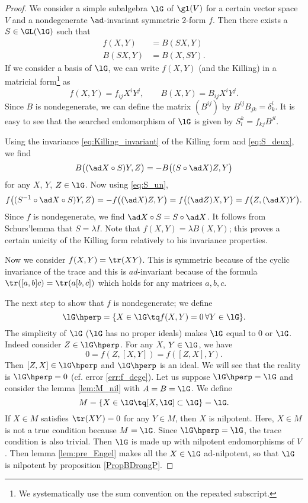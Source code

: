 \begin{proof}
    We consider a simple subalgebra $\lG$ of $\gl(V)$ for a certain vector space $V$ and a nondegenerate $\ad$-invariant symmetric $2$-form $f$. Then there exists a $S\in\GL(\lG)$ such that
    \begin{subequations}
    \begin{align}
      f(X,Y)&=B(SX,Y) \label{eq:S_un}  \\ 
      B(SX,Y)&=B(X,SY).  \label{eq:S_deux}
    \end{align}
    \end{subequations}
    If we consider a basis of $\lG$, we can write $f(X,Y)$ (and the Killing) in a matricial form\footnote{We systematically use the sum convention on the repeated subscript.} as
    \[
      f(X,Y)=f_{ij}X^iY^j,\qquad B(X,Y)=B_{ij}X^iY^j.
    \]
    Since $B$ is nondegenerate, we can define the matrix $(B^{ij})$ by $B^{ij}B_{jk}=\delta^i_k$. It is easy to see that the searched endomorphism of $\lG$ is given by $S^k_l=f_{kj}B^{jl}$.
     
    Using the invariance \eqref{eq:Killing_invariant} of the Killing form and \eqref{eq:S_deux}, we find
    \[
       B\big( (\ad X\circ S)Y,Z  \big)=-B\big( (S\circ\ad X)Z,Y  \big)
    \]
    for any $X$, $Y$, $Z\in\lG$. Now using \eqref{eq:S_un}, 
    \begin{equation}
     f\big(  (S^{-1}\circ\ad X\circ S)Y,Z  \big)=-f\big((\ad X) Z,Y\big)
                                               =f\big( (\ad Z) X,Y \big)
                           =f\big( Z, (\ad X)Y \big).
    \end{equation}
    Since $f$ is nondegenerate, we find $\ad X\circ S=S\circ\ad X$. It follows from Schurs'lemma that $S=\lambda I$. Note that $f(X,Y)=\lambda B(X,Y)$; this proves a certain unicity of the Killing form relatively to his invariance properties.

    Now we consider $f(X,Y)=\tr(XY)$. This is symmetric because of the cyclic invariance of the trace and this is $ad$-invariant because of the formula $\tr([a,b]c)=\tr(a[b,c])$ which holds for any matrices $a,b,c$.

    The next step to show that $f$ is nondegenerate; we define
    \[
      \lG\hperp=\{X\in\lG\tq f(X,Y)=0\,\forall Y\in\lG   \}.
    \]
    The simplicity of $\lG$ ($\lG$ has no proper ideals) makes $\lG$ equal to $0$ or $\lG$. Indeed consider $Z\in\lG\hperp$. For any $X$, $Y\in\lG$, we have
    \[
    0=f(Z,[X,Y])=f([Z,X],Y).
    \]
    Then $[Z,X]\in\lG\hperp$ and $\lG\hperp$ is an ideal. We will see that the reality is $\lG\hperp=0$ (cf. error \ref{err:f_dege}). Let us suppose $\lG\hperp=\lG$ and consider the lemma \ref{lem:M_nil} with $A=B=\lG$. We define
    \[
       M=\{ X\in\lG\tq [X,\lG]\subset\lG \}=\lG.
    \]
    If $X\in M$ satisfies $\tr(XY)=0$ for any $Y\in M$, then $X$ is nilpotent. Here, $X\in M$ is not a true condition because $M=\lG$. Since $\lG\hperp=\lG$, the trace condition is also trivial. Then $\lG$ is made up with nilpotent endomorphisms of $V$. Then lemma \ref{lem:pre_Engel} makes all the $X\in\lG$ ad-nilpotent, so that $\lG$ is nilpotent by proposition \ref{PropBDrongP}.


\end{proof}

